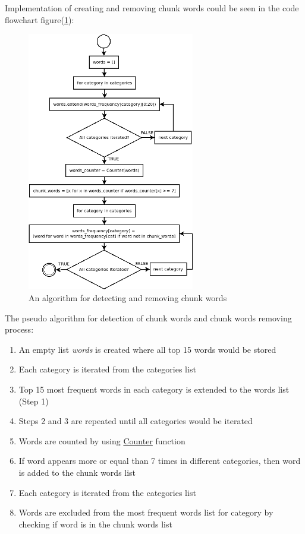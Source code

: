 Implementation of creating and removing chunk words could be seen in the code flowchart figure(\ref{fig:chunk_words}):
\begin{figure}[H]
    \centering
    \includegraphics[width=0.65\textwidth]{Pictures/chunk_words.png}
    \caption{\label{fig:chunk_words}{}An algorithm for detecting and removing chunk words }
\end{figure}


The pseudo algorithm for detection of chunk words and chunk words removing process:
\begin{enumerate}
    \item An empty list \textit{words} is created where all top 15 words would be stored
    \item Each category is iterated from the categories list
    \item Top 15 most frequent words in each category is extended to the words list (Step 1)
    \item Steps 2 and 3 are repeated until all categories would be iterated
    \item Words are counted by using \href{https://docs.python.org/2/library/collections.html}{Counter} function
    \item If word appears more or equal than 7 times in different categories, then word is added to the chunk words list
    \item Each category is iterated from the categories list
    \item Words are excluded from the most frequent words list for category by checking if word is in the chunk words list
\end{enumerate}


